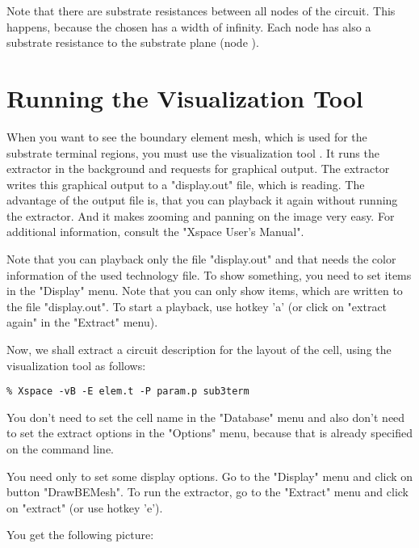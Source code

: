 \begin{figure}[h]
\centerline{}
\end{figure}

Note that there are substrate resistances between all nodes of the circuit.
This happens, because the chosen  has a width of infinity.
Each node has also a substrate resistance to the substrate plane (node ).

\section{Running the Visualization Tool}
When you want to see the boundary element mesh,
which is used for the substrate terminal regions,
you must use the visualization tool .
It runs the  extractor in the background and requests for graphical output.
The extractor writes this graphical output to a "display.out" file, which  is reading.
The advantage of the output file is, that you can playback it again without running the extractor.
And it makes zooming and panning on the image very easy.
For additional information, consult the "Xspace User's Manual".

Note that you can playback only the file "display.out" and that  needs the color
information of the used technology file.
To show something, you need to set items in the "Display" menu.
Note that you can only show items, which are written to the file "display.out".
To start a playback, use hotkey 'a' (or click on "extract again" in the "Extract" menu).

Now, we shall extract a circuit description for the layout of the  cell,
using the visualization tool as follows:
\small
\begin{Verbatim}
% Xspace -vB -E elem.t -P param.p sub3term
\end{Verbatim}
\normalsize
You don't need to set the cell name in the "Database" menu and
also don't need to set the extract options in the "Options" menu,
because that is already specified on the command line.

\noindent
You need only to set some display options.
Go to the "Display" menu and click on button "DrawBEMesh".
To run the extractor, go to the "Extract" menu and click on "extract" (or use hotkey 'e').

\noindent
You get the following picture:
\begin{figure}[h]
\centerline{}
\end{figure}

